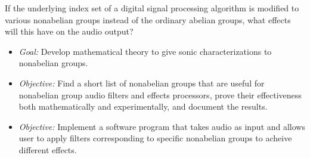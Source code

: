 \documentclass[10pt]{article}
\begin{document}
If the underlying index set of a digital signal processing algorithm is modified
to various nonabelian groups instead of the ordinary abelian groups, what
effects will this have on the audio output? 

\vskip5mm

\begin{itemize}
\item {\it Goal:}
Develop mathematical theory to give sonic characterizations to nonabelian groups.
\item
{\it Objective:} Find a short list of nonabelian groups that are useful for
nonabelian group audio filters and effects processors, prove their effectiveness
both mathematically and experimentally, and document the results.
\item
{\it Objective:} Implement a software program that takes audio as input and
allows user to apply filters corresponding to specific nonabelian groups to
acheive different effects. 
\end{itemize}
 
\end{document}
